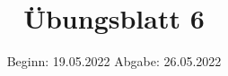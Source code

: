 

\title{Übungsblatt 6}
\date{%
  Beginn: 19.05.2022
  \hspace{3em}
  Abgabe: 26.05.2022
}



\maketitle
\thispagestyle{empty}
\tableofcontents
\newpage

%





